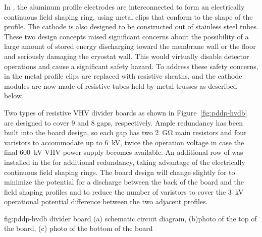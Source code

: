In , the aluminum profile electrodes are interconnected to form an electrically continuous field shaping ring, using metal clips that conform to the shape of the profile.  
The cathode is also designed to be constructed out of stainless steel tubes. 
These two design concepts raised significant concerns about the possibility of a large amount of stored energy discharging toward the membrane wall or the floor and seriously damaging the cryostat wall. This would virtually disable detector operations and cause a significant safety hazard.
To address these safety concerns, in   the metal profile clips are replaced with resistive sheaths, and the cathode modules are now made of resistive tubes held by metal trusses as described below.

Two types of resistive VHV divider boards as shown in Figure~\ref{fig:pddp-hvdb} are designed to cover \num{9} and \num{8} gaps, respectively.
Ample redundancy has been built into the board design, so each gap has two \SI{2}{\giga\ohm} main resistors and four varistors to accommodate up to \SI{6}{\kV}, twice the operation voltage in case the final \SI{600}{\kV} VHV power supply becomes available.
An additional row of  was installed in the  for additional redundancy, taking advantage of the electrically continuous field shaping rings.
The board design will change slightly for  to minimize the potential for a discharge between the back of the board and the field shaping profiles and to reduce the number of varistors to cover the \SI{3}{\kV} operational potential difference between the two adjacent profiles.

\begin{dunefigure}{fig:pddp-hvdb}{  divider board (a) schematic circuit diagram, (b)photo of the top of the board, (c) photo of the bottom of the board}
\end{dunefigure}

